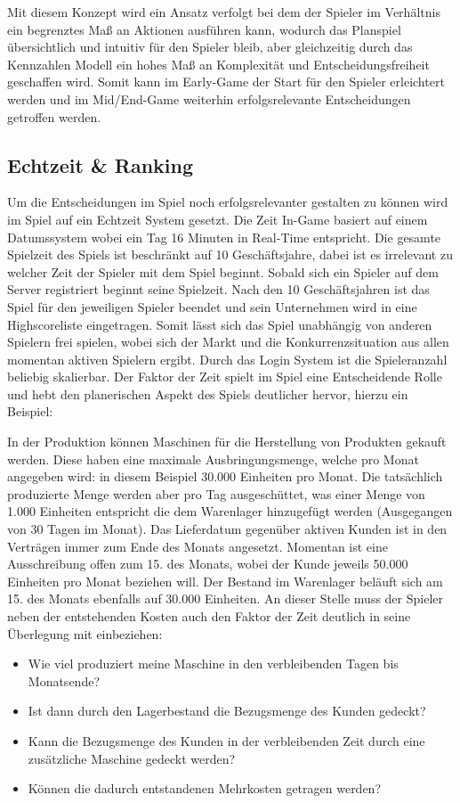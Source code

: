 \par Mit diesem Konzept wird ein Ansatz verfolgt bei dem der Spieler im Verhältnis ein begrenztes Maß an Aktionen ausführen kann, wodurch das Planspiel übersichtlich und intuitiv für den Spieler bleib, aber gleichzeitig durch das Kennzahlen Modell ein hohes Maß an Komplexität und Entscheidungsfreiheit geschaffen wird. Somit kann im Early-Game der Start für den Spieler erleichtert werden und im Mid/End-Game weiterhin erfolgsrelevante Entscheidungen getroffen werden.

\subsection{Echtzeit \& Ranking}
Um die Entscheidungen im Spiel noch erfolgsrelevanter gestalten zu können wird im Spiel auf ein Echtzeit System gesetzt. Die Zeit In-Game basiert auf einem Datumssystem wobei ein Tag 16 Minuten in Real-Time entspricht. Die gesamte Spielzeit des Spiels ist beschränkt auf 10 Geschäftsjahre, dabei ist es irrelevant zu welcher Zeit der Spieler mit dem Spiel beginnt. Sobald sich ein Spieler auf dem Server registriert beginnt seine Spielzeit. Nach den 10 Geschäftsjahren ist das Spiel für den jeweiligen Spieler beendet und sein Unternehmen wird in eine Highscoreliste eingetragen. Somit lässt sich das Spiel unabhängig von anderen Spielern frei spielen, wobei sich der Markt und die Konkurrenzsituation aus allen momentan aktiven Spielern ergibt. Durch das Login System ist die Spieleranzahl beliebig skalierbar. Der Faktor der Zeit spielt im Spiel eine Entscheidende Rolle und hebt den planerischen Aspekt des Spiels deutlicher hervor, hierzu ein Beispiel:
\par In der Produktion können Maschinen für die Herstellung von Produkten gekauft werden. Diese haben eine maximale Ausbringungsmenge, welche pro Monat angegeben wird: in diesem Beispiel 30.000 Einheiten pro Monat. Die tatsächlich produzierte Menge werden aber pro Tag ausgeschüttet, was einer Menge von 1.000 Einheiten entspricht die dem Warenlager hinzugefügt werden (Ausgegangen von 30 Tagen im Monat). Das Lieferdatum gegenüber aktiven Kunden ist in den Verträgen immer zum Ende des Monats angesetzt. Momentan ist eine Ausschreibung offen zum 15. des Monats, wobei der Kunde jeweils 50.000 Einheiten pro Monat beziehen will. Der Bestand im Warenlager beläuft sich am 15. des Monats ebenfalls auf 30.000 Einheiten. An dieser Stelle muss der Spieler neben der entstehenden Kosten auch den Faktor der Zeit deutlich in seine Überlegung mit einbeziehen:
\begin{itemize}
   \item Wie viel produziert meine Maschine in den verbleibenden Tagen bis Monatsende?
    \item Ist dann durch den Lagerbestand die Bezugsmenge des Kunden gedeckt?
    \item Kann die Bezugsmenge des Kunden in der verbleibenden Zeit durch eine zusätzliche Maschine gedeckt werden?
    \item Können die dadurch entstandenen Mehrkosten getragen werden?
\end{itemize}
